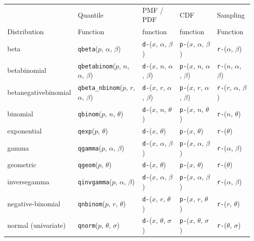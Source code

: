 \documentclass[12pt]{article}
\begin{document}
\begin{table}[htp]
\centering
\small
\begin{tabular}{l | llll}
                 & Quantile  & PMF / PDF  &CDF       & Sampling  \\ 
Distribution &  Function & function         & function &  Function \\ \hline
beta & \texttt{qbeta}($p$, $\alpha$, $\beta$)             
& \texttt{d-}($x$, $\alpha$, $\beta$)
& \texttt{p-}($x$, $\alpha$, $\beta$) 
& \texttt{r-}($\alpha$, $\beta$) \\
betabinomial & \texttt{qbetabinom}($p$, $n$, $\alpha$, $\beta$)              
& \texttt{d-}($x$, $n$, $\alpha$, $\beta$)
& \texttt{p-}($x$, $n$, $\alpha$, $\beta$) 
& \texttt{r-}($n$, $\alpha$, $\beta$) \\

betanegativebinomial & \texttt{qbeta\_nbinom}($p$, $r$, $\alpha$, $\beta$) 
& \texttt{d-}($x$, $r$, $\alpha$, $\beta$)
& \texttt{p-}($x$, $r$, $\alpha$, $\beta$) 
& \texttt{r-}($r$, $\alpha$, $\beta$) \\

binomial & \texttt{qbinom}($p$, $n$, $\theta$) 
& \texttt{d-}($x$, $n$, $\theta$)
& \texttt{p-}($x$, $n$, $\theta$) 
& \texttt{r-}($n$, $\theta$) \\

exponential & \texttt{qexp}($p$, $\theta$) 
& \texttt{d-}($x$, $\theta$) 
& \texttt{p-}($x$, $\theta$) 
& \texttt{r-}($\theta$) \\

gamma & \texttt{qgamma}($p$, $\alpha$, $\beta$) 
& \texttt{d-}($x$, $\alpha$, $\beta$)
& \texttt{p-}($x$, $\alpha$, $\beta$) 
& \texttt{r-}($\alpha$, $\beta$) \\

geometric & \texttt{qgeom}($p$, $\theta$) 
& \texttt{d-}($x$, $\theta$)
& \texttt{p-}($x$, $\theta$) 
& \texttt{r-}($\theta$) \\

inversegamma & \texttt{qinvgamma}($p$, $\alpha$, $\beta$) 
& \texttt{d-}($x$, $\alpha$, $\beta$)
& \texttt{p-}($x$, $\alpha$, $\beta$) 
& \texttt{r-}($\alpha$, $\beta$) \\

negative-binomial & \texttt{qnbinom}($p$, $r$, $\theta$) 
& \texttt{d-}($x$, $r$, $\theta$) 
& \texttt{p-}($x$, $r$, $\theta$) 
& \texttt{r-}($r$, $\theta$) \\

normal (univariate) & \texttt{qnorm}($p$, $\theta$, $\sigma$) 
& \texttt{d-}($x$, $\theta$, $\sigma$)
& \texttt{p-}($x$, $\theta$, $\sigma$) 
& \texttt{r-}($\theta$, $\sigma$) \\


\end{tabular}
\end{table}
\end{document}
